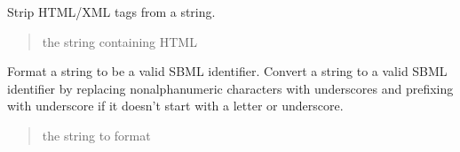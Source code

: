 \documentclass[letterpaper,12pt,english]{sphinxmanual}
\begin{document}

\begin{fulllineitems}
\label{\detokenize{api/io:cbmpy.CBXML.xml_stripTags}}
\pysigstartsignatures
\pysiglinewithargsret
{}
{}
{}
\pysigstopsignatures
\sphinxAtStartPar
Strip HTML/XML tags from a string.
\begin{quote}\begin{description}
\sphinxAtStartPar
{} \textendash{} the string containing HTML

\sphinxAtStartPar
{}

\end{description}\end{quote}

\end{fulllineitems}


\begin{fulllineitems}
\label{\detokenize{api/io:cbmpy.CBXML.formatSbmlId}}
\pysigstartsignatures
\pysiglinewithargsret
{}
{}
{}
\pysigstopsignatures
\sphinxAtStartPar
Format a string to be a valid SBML identifier. Convert a string to a valid SBML identifier by replacing non\sphinxhyphen{}alphanumeric characters with underscores and prefixing with underscore if it doesn’t start with a letter or underscore.
\begin{quote}\begin{description}
\sphinxAtStartPar
{} \textendash{} the string to format

\sphinxAtStartPar
{}

\end{description}\end{quote}

\end{fulllineitems}

\end{document}
